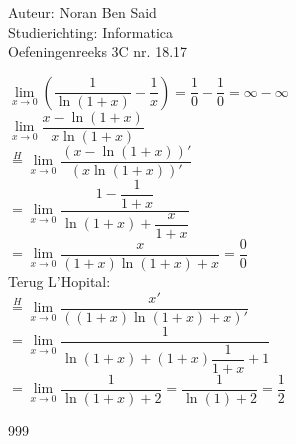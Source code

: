 \documentclass[a4paper]{article}
\begin{document}
\noindent \large Auteur: Noran Ben Said\\
\noindent \large Studierichting: Informatica\\
\noindent \large Oefeningenreeks 3C nr. 18.17 \\

\medskip
\normalsize

$\lim\limits_{x \to 0} \left(\dfrac{1}{\ln(1+x)} - \dfrac{1}{x}\right) = \dfrac{1}{0} - \dfrac{1}{0} =\infty - \infty$\\

$\lim\limits_{x \to 0} \dfrac{x - \ln(1+x)}{x\ln(1+x)}$\\

$\overset{H}{=} \lim\limits_{x \to 0} \dfrac{(x - \ln(1+x))'}{(x\ln(1+x))'}$\\

$= \lim\limits_{x \to 0} \dfrac{1 - \dfrac{1}{1+x}}
{\ln(1+x) + \dfrac{x}{1+x}}$\\

$= \lim\limits_{x \to 0} \dfrac{x}{(1+x)\ln(1+x) + x} = \dfrac{0}{0}$\\

Terug L'Hopital:\\

$\overset{H}{=} \lim\limits_{x \to 0} \dfrac{x'}{\left((1+x)\ln(1+x) + x\right)'}$\\

$= \lim\limits_{x \to 0} \dfrac{1}{\ln(1+x) + (1+x)\dfrac{1}{1+x} + 1}$\\

$ = \lim\limits_{x \to 0}\dfrac{1}{\ln(1+x) + 2}
= \dfrac{1}{\ln(1) + 2} = \dfrac{1}{2}$\\



\begin{thebibliography}{999}
\end{thebibliography}
\end{document}
